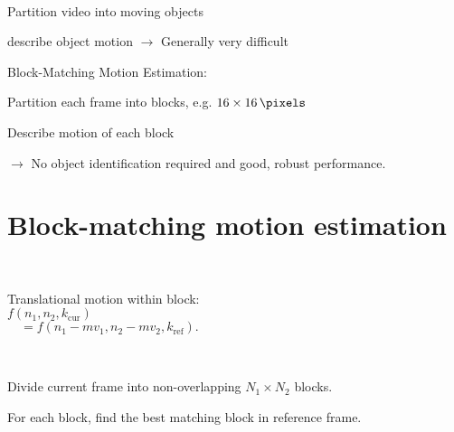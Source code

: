\begin{compactdesc}
	\item[\lp{Ideal situation}]\hfill\\
		\begin{enumerate*}[label=\protect\circled{\arabic*},itemjoin=]
			\item Partition video into moving objects \\
			\item describe object motion $\to$ Generally very difficult\\
		\end{enumerate*}
	\item[\lp{Practical approach}] Block-Matching Motion Estimation:\hfill\\
		\begin{enumerate*}[label=\protect\circled{\arabic*},itemjoin=]
			\item Partition each frame into blocks, e.g. $16\times\SI{16}{\pixels}$\\
			\item Describe motion of each block\\
		\end{enumerate*}
		$\to$  No object identification required and good, robust performance.
\section{Block-matching motion estimation}
\item[\lp{Assumptions:}]\hfill\\
\begin{enumerate*}[label=\protect\circled{\arabic*},itemjoin=]
	\item Translational motion within block:\\
		$f(n_1,n_2,k_{\text{cur}})$\\$\quad=f(n_1-mv_1,n_2-mv_2,k_{\text{ref}}).$
\end{enumerate*}
\item[\lp{ME Algorithm}]\hfill\\ 
	\begin{enumerate*}[label=\protect\circled{\arabic*},itemjoin=]
		\item Divide current frame into non-overlapping $N_1\times N_2$ blocks.\\
		\item For each block, find the best matching block in reference frame.
	\end{enumerate*}

\end{compactdesc}
